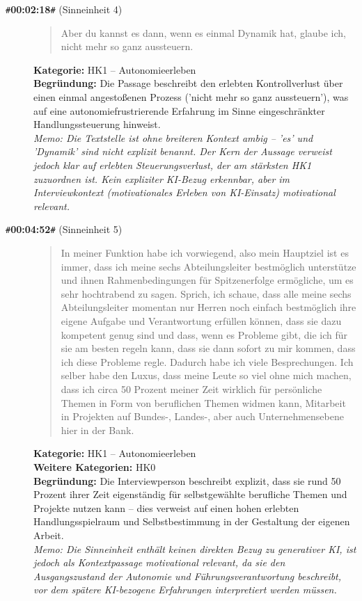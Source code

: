 \begin{description}
  \item[\texttt{\#}\textbf{00:02:18}\texttt{\#} (Sinneinheit 4)]
  \begin{quote}
  Aber du kannst es dann, wenn es einmal Dynamik hat, glaube ich, nicht mehr so ganz aussteuern.
  \end{quote}
  \textbf{Kategorie:} HK1 -- Autonomieerleben\\
  \textbf{Begr\"undung:} Die Passage beschreibt den erlebten Kontrollverlust über einen einmal angestoßenen Prozess ('nicht mehr so ganz aussteuern'), was auf eine autonomiefrustrierende Erfahrung im Sinne eingeschränkter Handlungssteuerung hinweist.
  \\\textit{Memo: Die Textstelle ist ohne breiteren Kontext ambig – 'es' und 'Dynamik' sind nicht explizit benannt. Der Kern der Aussage verweist jedoch klar auf erlebten Steuerungsverlust, der am stärksten HK1 zuzuordnen ist. Kein expliziter KI-Bezug erkennbar, aber im Interviewkontext (motivationales Erleben von KI-Einsatz) motivational relevant.}
\end{description}
\medskip

\begin{description}
  \item[\texttt{\#}\textbf{00:04:52}\texttt{\#} (Sinneinheit 5)]
  \begin{quote}
  In meiner Funktion habe ich vorwiegend, also mein Hauptziel ist es immer, dass ich meine sechs Abteilungsleiter bestmöglich unterstütze und ihnen Rahmenbedingungen für Spitzenerfolge ermögliche, um es sehr hochtrabend zu sagen. Sprich, ich schaue, dass alle meine sechs Abteilungsleiter momentan nur Herren noch einfach bestmöglich ihre eigene Aufgabe und Verantwortung erfüllen können, dass sie dazu kompetent genug sind und dass, wenn es Probleme gibt, die ich für sie am besten regeln kann, dass sie dann sofort zu mir kommen, dass ich diese Probleme regle. Dadurch habe ich viele Besprechungen. Ich selber habe den Luxus, dass meine Leute so viel ohne mich machen, dass ich circa 50 Prozent meiner Zeit wirklich für persönliche Themen in Form von beruflichen Themen widmen kann, Mitarbeit in Projekten auf Bundes-, Landes-, aber auch Unternehmensebene hier in der Bank.
  \end{quote}
  \textbf{Kategorie:} HK1 -- Autonomieerleben\\
  \textbf{Weitere Kategorien:} HK0\\
  \textbf{Begr\"undung:} Die Interviewperson beschreibt explizit, dass sie rund 50 Prozent ihrer Zeit eigenständig für selbstgewählte berufliche Themen und Projekte nutzen kann – dies verweist auf einen hohen erlebten Handlungsspielraum und Selbstbestimmung in der Gestaltung der eigenen Arbeit.
  \\\textit{Memo: Die Sinneinheit enthält keinen direkten Bezug zu generativer KI, ist jedoch als Kontextpassage motivational relevant, da sie den Ausgangszustand der Autonomie und Führungsverantwortung beschreibt, vor dem spätere KI-bezogene Erfahrungen interpretiert werden müssen.}
\end{description}
\medskip

